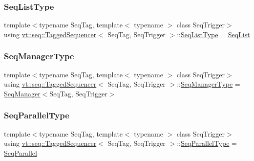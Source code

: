 \subsubsection{\texorpdfstring{Seq\+List\+Type}{SeqListType}}
{\footnotesize\ttfamily template$<$typename Seq\+Tag, template$<$ typename $>$ class Seq\+Trigger$>$ \\
using \hyperlink{structvt_1_1seq_1_1_tagged_sequencer}{vt\+::seq\+::\+Tagged\+Sequencer}$<$ Seq\+Tag, Seq\+Trigger $>$\+::\hyperlink{structvt_1_1seq_1_1_tagged_sequencer_a8df6e02cdb7c2b38870f7ee7776f6f9c}{Seq\+List\+Type} =  \hyperlink{structvt_1_1seq_1_1_seq_list}{Seq\+List}}

\mbox{\label{structvt_1_1seq_1_1_tagged_sequencer_a892e0a759dc975bf74e35f9ebf7a2967}} 
\subsubsection{\texorpdfstring{Seq\+Manager\+Type}{SeqManagerType}}
{\footnotesize\ttfamily template$<$typename Seq\+Tag, template$<$ typename $>$ class Seq\+Trigger$>$ \\
using \hyperlink{structvt_1_1seq_1_1_tagged_sequencer}{vt\+::seq\+::\+Tagged\+Sequencer}$<$ Seq\+Tag, Seq\+Trigger $>$\+::\hyperlink{structvt_1_1seq_1_1_tagged_sequencer_a892e0a759dc975bf74e35f9ebf7a2967}{Seq\+Manager\+Type} =  \hyperlink{structvt_1_1seq_1_1_seq_manager}{Seq\+Manager}$<$Seq\+Tag, Seq\+Trigger$>$}

\mbox{\label{structvt_1_1seq_1_1_tagged_sequencer_a90808f66a0bd9a5e523c86f00c4b295d}} 
\subsubsection{\texorpdfstring{Seq\+Parallel\+Type}{SeqParallelType}}
{\footnotesize\ttfamily template$<$typename Seq\+Tag, template$<$ typename $>$ class Seq\+Trigger$>$ \\
using \hyperlink{structvt_1_1seq_1_1_tagged_sequencer}{vt\+::seq\+::\+Tagged\+Sequencer}$<$ Seq\+Tag, Seq\+Trigger $>$\+::\hyperlink{structvt_1_1seq_1_1_tagged_sequencer_a90808f66a0bd9a5e523c86f00c4b295d}{Seq\+Parallel\+Type} =  \hyperlink{structvt_1_1seq_1_1_seq_parallel}{Seq\+Parallel}}

